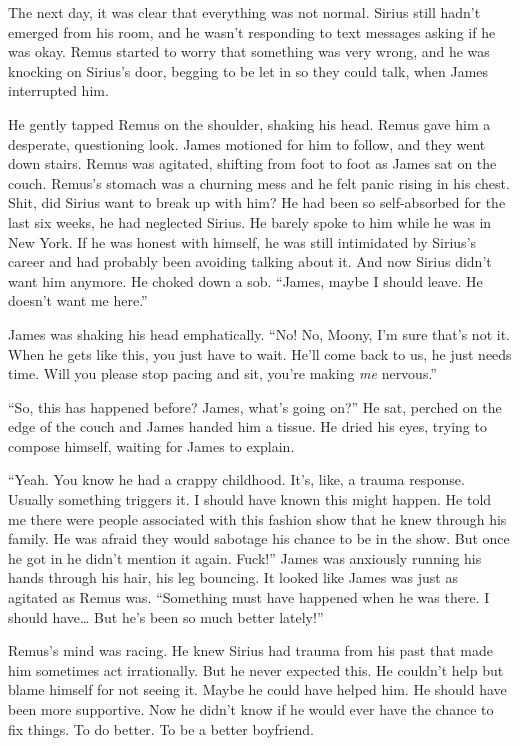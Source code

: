 \documentclass[12pt,twoside,openright]{memoir}
\begin{document}
The next day, it was clear that everything was not normal. Sirius still hadn't emerged from his room, and he wasn't responding to text messages asking if he was okay. Remus started to worry that something was very wrong, and he was knocking on Sirius's door, begging to be let in so they could talk, when James interrupted him.

He gently tapped Remus on the shoulder, shaking his head. Remus gave him a desperate, questioning look. James motioned for him to follow, and they went down stairs. Remus was agitated, shifting from foot to foot as James sat on the couch. Remus's stomach was a churning mess and he felt panic rising in his chest. Shit, did Sirius want to break up with him?
He had been so self-absorbed for the last six weeks, he had neglected Sirius. He barely spoke to him while he was in New York. If he was honest with himself, he was still intimidated by Sirius's career and had probably been avoiding talking about it. And now Sirius didn't want him anymore. He choked down a sob. ``James, maybe I should leave. He doesn't want me here.'' 

James was shaking his head emphatically. ``No! No, Moony, I'm sure that's not it. When he gets like this, you just have to wait. He'll come back to us, he just needs time. Will you please stop pacing and sit, you're making
\textit{me} nervous.''

``So, this has happened before? James, what's going on?'' He sat, perched on the edge of the couch and James handed him a tissue. He dried his eyes, trying to compose himself, waiting for James to explain.

``Yeah. You know he had a crappy childhood. It's, like, a trauma response. Usually something triggers it. I should have known this might happen. He told me there were people associated with this fashion show that he knew through his family. He was afraid they would sabotage his chance to be in the show. But once he got in he didn't mention it again. Fuck!'' James was anxiously running his hands through his hair, his leg bouncing. It looked like James was just as agitated as Remus was. ``Something must have happened when he was there. I should have… But he's been so much better lately!''

Remus's mind was racing. He knew Sirius had trauma from his past that made him sometimes act irrationally. But he never expected this. He couldn't help but blame himself for not seeing it. Maybe he could have helped him. He should have been more supportive. Now he didn't know if he would ever have the chance to fix things. To do better. To be a better boyfriend.
\end{document}
